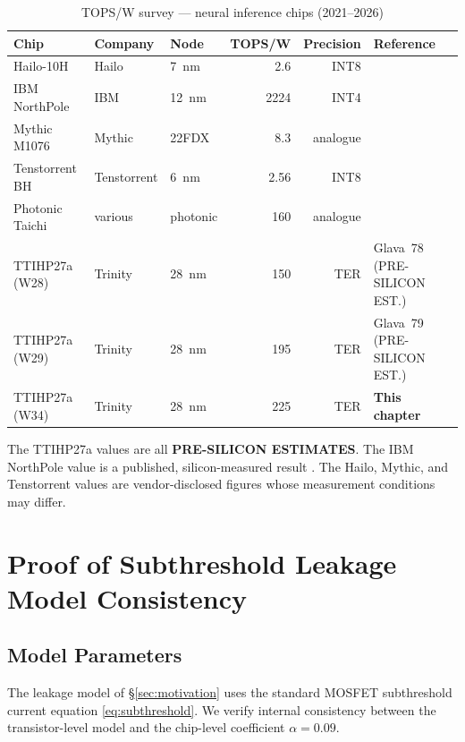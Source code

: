 \begin{table}[ht]
\centering
\caption{TOPS/W survey --- neural inference chips (2021--2026)}
\label{tab:tops_w_survey}
\begin{tabular}{lllrrl}
\hline
Chip & Company & Node & TOPS/W & Precision & Reference \\
\hline
Hailo-10H      & Hailo       & 7~nm     & 2.6     & INT8     & \cite{hailo10h_2024} \\
IBM NorthPole  & IBM         & 12~nm    & 2224    & INT4     & \cite{ibm_northpole_2023} \\
Mythic M1076   & Mythic      & 22FDX    & 8.3     & analogue & \cite{mythic_m1076_2021} \\
Tenstorrent BH & Tenstorrent & 6~nm     & 2.56    & INT8     & \cite{tenstorrent_blackhole_2025} \\
Photonic Taichi & various    & photonic & 160     & analogue & \cite{photonic_taichi_2024} \\
TTIHP27a (W28) & Trinity     & 28~nm    & 150     & TER      & Glava~78 (PRE-SILICON EST.) \\
TTIHP27a (W29) & Trinity     & 28~nm    & 195     & TER      & Glava~79 (PRE-SILICON EST.) \\
TTIHP27a (W34) & Trinity     & 28~nm    & 225     & TER      & \textbf{This chapter} \\
\hline
\end{tabular}
\end{table}

\noindent The TTIHP27a values are all \textbf{PRE-SILICON ESTIMATES}.  The IBM NorthPole
value is a published, silicon-measured result \cite{ibm_northpole_2023}.
The Hailo, Mythic, and Tenstorrent values are vendor-disclosed figures
whose measurement conditions may differ.

\section{Proof of Subthreshold Leakage Model Consistency}
\label{app:leakage_consistency}

\subsection{Model Parameters}

The leakage model of \S\ref{sec:motivation} uses the standard MOSFET
subthreshold current equation \eqref{eq:subthreshold}.  We verify
internal consistency between the transistor-level model and the
chip-level coefficient \(\alpha = 0.09\).

